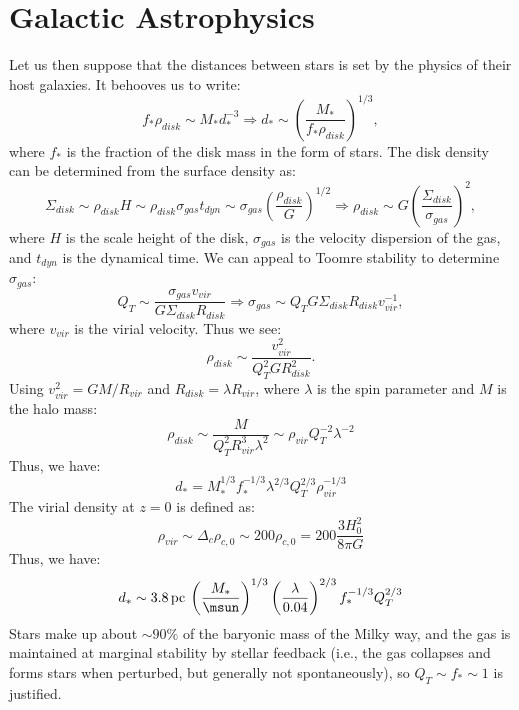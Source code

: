 \documentclass{article}
\begin{document}
  \section{Galactic Astrophysics}
  Let us then suppose that the distances between stars is set by the physics of their host galaxies.  It behooves us to write:
  \begin{equation}
    f_{\ast}\rho_{disk} \sim M_{\ast}d^{-3}_{\ast}\Longrightarrow d_{\ast} \sim \left(\frac{M_{\ast}}{f_{\ast}\rho_{disk}}\right)^{1/3},
  \end{equation}
  where $f_{\ast}$ is the fraction of the disk mass in the form of stars.  The disk density can be determined from the surface density as:
  \begin{equation}
    \Sigma_{disk} \sim \rho_{disk}H \sim \rho_{disk}\sigma_{gas}t_{dyn} \sim \sigma_{gas}\left(\frac{\rho_{disk}}{G}\right)^{1/2}\Longrightarrow\rho_{disk} \sim G\left(\frac{\Sigma_{disk}}{\sigma_{gas}}\right)^{2},
  \end{equation}
  where $H$ is the scale height of the disk, $\sigma_{gas}$ is the velocity dispersion of the gas, and $t_{dyn}$ is the dynamical time.  We can appeal to Toomre stability to determine $\sigma_{gas}$:
  \begin{equation}
    Q_{T} \sim \frac{\sigma_{gas}v_{vir}}{G\Sigma_{disk}R_{disk}}\Longrightarrow \sigma_{gas}\sim Q_{T}G\Sigma_{disk}R_{disk}v_{vir}^{-1},
  \end{equation}
  where $v_{vir}$ is the virial velocity.  Thus we see:
  \begin{equation}
    \rho_{disk} \sim \frac{v_{vir}^{2}}{Q_{T}^{2}GR_{disk}^{2}}.
  \end{equation}
  Using $v_{vir}^{2}=GM/R_{vir}$ and $R_{disk}=\lambda R_{vir}$, where $\lambda$ is the spin parameter and $M$ is the halo mass:
  \begin{equation}
    \rho_{disk} \sim \frac{M}{Q_{T}^{2}R_{vir}^{3}\lambda^{2}} \sim \rho_{vir}Q_{T}^{-2}\lambda^{-2}
  \end{equation}
  Thus, we have:
  \begin{equation}
    d_{\ast} = M_{\ast}^{1/3}f_{\ast}^{-1/3}\lambda^{2/3}Q_{T}^{2/3}\rho_{vir}^{-1/3}
  \end{equation}
  The virial density at $z=0$ is defined as:
  \begin{equation}
    \rho_{vir}\sim\Delta_{c}\rho_{c,0}\sim 200\rho_{c,0} = 200\frac{3H_{0}^{2}}{8\pi G}
  \end{equation}
  Thus, we have:
  \begin{equation}
    d_{\ast} \sim \SI{3.8}{pc}\:\left(\frac{M_{\ast}}{\si{\msun}}\right)^{1/3}\left(\frac{\lambda}{0.04}\right)^{2/3}f_{\ast}^{-1/3}Q_{T}^{2/3}
  \end{equation}
  Stars make up about $\sim90\%$ of the baryonic mass of the Milky way, and the gas is maintained at marginal stability by stellar feedback (i.e., the gas collapses and forms stars when perturbed, but generally not spontaneously), so $Q_{T}\sim f_{\ast} \sim 1$ is justified.
  
  
\end{document}
